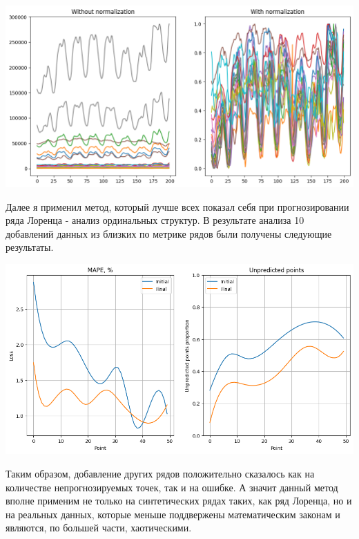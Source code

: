 \documentclass[a4paper, 12pt]{extarticle}
\begin{document}
\begin{center}
    \includegraphics[width=\textwidth]{img/consumption_series.png}
\end{center}

Далее я применил метод, который лучше всех показал себя при прогнозировании ряда Лоренца - анализ ординальных структур. В результате анализа 10 добавлений данных из близких по метрике рядов были получены следующие результаты. 

\begin{center}
    \includegraphics[width=\textwidth]{img/consumption.png}
\end{center}

Таким образом, добавление других рядов положительно сказалось как на количестве непрогнозируемых точек, так и на ошибке. А значит данный метод вполне применим не только на синтетических рядах таких, как ряд Лоренца, но и на реальных данных, которые меньше поддвержены математическим законам и являются, по большей части, хаотическими.
\end{document}
